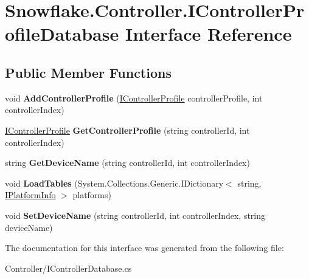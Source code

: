 \hypertarget{interface_snowflake_1_1_controller_1_1_i_controller_profile_database}{}\section{Snowflake.\+Controller.\+I\+Controller\+Profile\+Database Interface Reference}
\label{interface_snowflake_1_1_controller_1_1_i_controller_profile_database}
\subsection*{Public Member Functions}
\begin{DoxyCompactItemize}
\item 
\hypertarget{interface_snowflake_1_1_controller_1_1_i_controller_profile_database_ac468d872335c4cdbedaffa5e942654ee}{}void {\bfseries Add\+Controller\+Profile} (\hyperlink{interface_snowflake_1_1_controller_1_1_i_controller_profile}{I\+Controller\+Profile} controller\+Profile, int controller\+Index)\label{interface_snowflake_1_1_controller_1_1_i_controller_profile_database_ac468d872335c4cdbedaffa5e942654ee}

\item 
\hypertarget{interface_snowflake_1_1_controller_1_1_i_controller_profile_database_a1e6de30f211c2de303f9c5944ce01969}{}\hyperlink{interface_snowflake_1_1_controller_1_1_i_controller_profile}{I\+Controller\+Profile} {\bfseries Get\+Controller\+Profile} (string controller\+Id, int controller\+Index)\label{interface_snowflake_1_1_controller_1_1_i_controller_profile_database_a1e6de30f211c2de303f9c5944ce01969}

\item 
\hypertarget{interface_snowflake_1_1_controller_1_1_i_controller_profile_database_abe919ad0989f8404b347ae1baa1119f3}{}string {\bfseries Get\+Device\+Name} (string controller\+Id, int controller\+Index)\label{interface_snowflake_1_1_controller_1_1_i_controller_profile_database_abe919ad0989f8404b347ae1baa1119f3}

\item 
\hypertarget{interface_snowflake_1_1_controller_1_1_i_controller_profile_database_ac0056d73bdaa49c3d8e40f6ea987ed6e}{}void {\bfseries Load\+Tables} (System.\+Collections.\+Generic.\+I\+Dictionary$<$ string, \hyperlink{interface_snowflake_1_1_platform_1_1_i_platform_info}{I\+Platform\+Info} $>$ platforms)\label{interface_snowflake_1_1_controller_1_1_i_controller_profile_database_ac0056d73bdaa49c3d8e40f6ea987ed6e}

\item 
\hypertarget{interface_snowflake_1_1_controller_1_1_i_controller_profile_database_a00da034510f729461b53d7bce4a1bd4e}{}void {\bfseries Set\+Device\+Name} (string controller\+Id, int controller\+Index, string device\+Name)\label{interface_snowflake_1_1_controller_1_1_i_controller_profile_database_a00da034510f729461b53d7bce4a1bd4e}

\end{DoxyCompactItemize}


The documentation for this interface was generated from the following file\+:\begin{DoxyCompactItemize}
\item 
Controller/I\+Controller\+Database.\+cs\end{DoxyCompactItemize}

